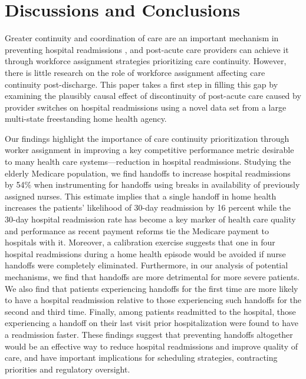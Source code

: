 \documentclass[final,12pt, notitlepage]{article}
\begin{document}
\section{Discussions and Conclusions} \label{sec:conclusion}

Greater continuity and coordination of care are an important mechanism in preventing hospital readmissions \citep{Naylor1999}, and post-acute care providers can achieve it through workforce assignment strategies prioritizing care continuity. However, there is little research on the role of workforce assignment affecting care continuity post-discharge. This paper takes a first step in filling this gap by examining the plausibly causal effect of discontinuity of post-acute care caused by provider switches on hospital readmissions using a novel data set from a large multi-state freestanding home health agency.


Our findings highlight the importance of care continuity prioritization through worker assignment in improving a key competitive performance metric desirable to many health care systems---reduction in hospital readmissions. Studying the elderly Medicare population, we find handoffs to increase hospital readmissions by 54\% when instrumenting for handoffs using breaks in availability of previously assigned nurses.
This estimate implies that a single handoff in home health increases the patients' likelihood of 30-day readmission by 16 percent while the 30-day hospital readmission rate has become a key marker of health care quality and performance as recent payment reforms tie the Medicare payment to hospitals with it.
 Moreover, a calibration exercise suggests that one in four hospital readmissions during a home health episode would be avoided if nurse handoffs were completely eliminated.
Furthermore, in our analysis of potential mechanisms, we find that handoffs are more detrimental for more severe patients. We also find that patients experiencing handoffs for the first time are more likely to have a hospital readmission relative to those experiencing such handoffs for the second and third time. Finally, among patients readmitted to the hospital, those experiencing a handoff on their last visit prior hospitalization were found to have a readmission faster.
These findings suggest that preventing handoffs altogether would be an effective way to reduce hospital readmissions and improve quality of care, and have important implications for scheduling strategies, contracting priorities and regulatory oversight.
\end{document}
